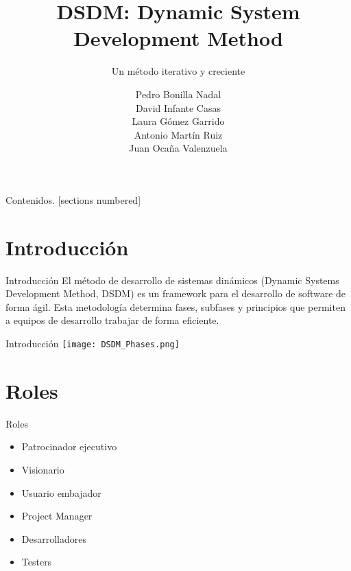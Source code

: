 \documentclass[usenames,dvipsnames]{beamer}
\subtitle{Un método iterativo y creciente}
\title{DSDM: Dynamic System Development
Method}
\date{}
\institute{Universidad de Granada}
\author{Pedro Bonilla Nadal\\
David Infante Casas\\
Laura Gómez Garrido\\
Antonio Martín Ruiz\\
Juan Ocaña Valenzuela}
\begin{document}
\maketitle
\begin{frame}{Contenidos.}
  [sections numbered]
  \tableofcontents [hideallsubsections]
\end{frame}

\section{Introducción}
\begin{frame}{Introducción}
El método de desarrollo de sistemas dinámicos (Dynamic Systems Development Method, DSDM) es un framework para el desarrollo de software de forma ágil. Esta metodología determina fases, subfases y principios que permiten a equipos de desarrollo trabajar de forma eficiente.

\end{frame}

\begin{frame}{Introducción}
    \centering
        \texttt{[image: DSDM\_Phases.png]}
\end{frame}



\section{Roles}
\begin{frame}{Roles}
    \begin{itemize}
        \item Patrocinador ejecutivo
        \item Visionario
        \item Usuario embajador
        \item Project Manager
        \item Desarrolladores
        \item Testers
    \end{itemize}{}
\end{frame}{}
\end{document}
